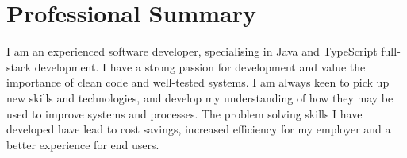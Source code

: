 \section{Professional Summary}
I am an experienced software developer, specialising in Java and TypeScript full-stack development. 
I have a strong passion for development and value the importance of clean code and well-tested systems. 
I am always keen to pick up new skills and technologies, and develop my understanding of how they may be used to improve systems and processes.
The problem solving skills I have developed have lead to cost savings, increased efficiency for my employer and a better experience for end users.